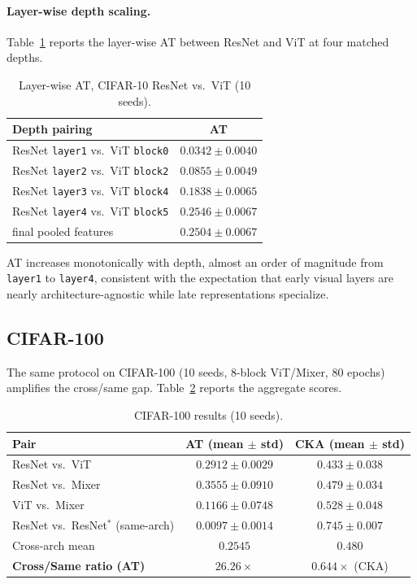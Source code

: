 \documentclass[11pt]{article}
\begin{document}
\paragraph{Layer-wise depth scaling.}
Table~\ref{tab:cifar10-layers} reports the layer-wise AT between ResNet
and ViT at four matched depths.

\begin{table}[t]
\centering
\caption{Layer-wise AT, CIFAR-10 ResNet vs.\ ViT (10 seeds).}
\label{tab:cifar10-layers}
\begin{tabular}{lc}
\toprule
Depth pairing & AT \\
\midrule
ResNet \texttt{layer1} vs.\ ViT \texttt{block0} & $0.0342 \pm 0.0040$ \\
ResNet \texttt{layer2} vs.\ ViT \texttt{block2} & $0.0855 \pm 0.0049$ \\
ResNet \texttt{layer3} vs.\ ViT \texttt{block4} & $0.1838 \pm 0.0065$ \\
ResNet \texttt{layer4} vs.\ ViT \texttt{block5} & $0.2546 \pm 0.0067$ \\
final pooled features                          & $0.2504 \pm 0.0067$ \\
\bottomrule
\end{tabular}
\end{table}

AT increases monotonically with depth, almost an order of magnitude
from \texttt{layer1} to \texttt{layer4}, consistent with the
expectation that early visual layers are nearly architecture-agnostic
while late representations specialize.

\subsection{CIFAR-100}

The same protocol on CIFAR-100 (10 seeds, 8-block ViT/Mixer, 80 epochs)
amplifies the cross/same gap. Table~\ref{tab:cifar100} reports the
aggregate scores.

\begin{table}[t]
\centering
\caption{CIFAR-100 results (10 seeds).}
\label{tab:cifar100}
\begin{tabular}{lcc}
\toprule
Pair & AT (mean $\pm$ std) & CKA (mean $\pm$ std) \\
\midrule
ResNet vs.\ ViT     & $0.2912 \pm 0.0029$ & $0.433 \pm 0.038$ \\
ResNet vs.\ Mixer   & $0.3555 \pm 0.0910$ & $0.479 \pm 0.034$ \\
ViT vs.\ Mixer      & $0.1166 \pm 0.0748$ & $0.528 \pm 0.048$ \\
\midrule
ResNet vs.\ ResNet$^*$ (same-arch) & $0.0097 \pm 0.0014$ & $0.745 \pm 0.007$ \\
\midrule
Cross-arch mean     & $0.2545$            & $0.480$ \\
\textbf{Cross/Same ratio (AT)} & $\mathbf{26.26\times}$ & $0.644\times$ (CKA) \\
\bottomrule
\end{tabular}
\end{table}
\end{document}
